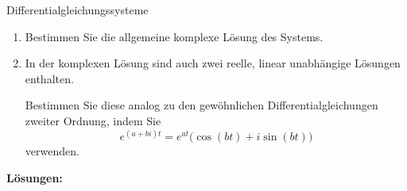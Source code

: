 \begin{ueb}{Differentialgleichungssysteme}{}
\begin{enumerate}
              \begin{enumerate}
                  \item Bestimmen Sie die allgemeine komplexe Lösung des Systems.

                  \item In der komplexen Lösung sind auch zwei reelle,
                        linear unabhängige Lösungen enthalten.

                        Bestimmen Sie diese analog zu den gewöhnlichen
                        Differentialgleichungen zweiter Ordnung, indem Sie
                        \[
                            e^{(a+bi)t}
                            =
                            e^{at}\bigl(\cos(bt)+i\sin(bt)\bigr)
                        \]
                        verwenden.
              \end{enumerate}
    \end{enumerate}

\end{ueb}

\clearpage

\textbf{Lösungen:}

